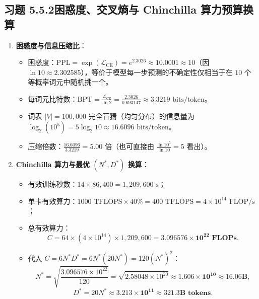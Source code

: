 \subsection*{习题 5.5.2\quad 困惑度、交叉熵与 Chinchilla 算力预算换算}
\begin{enumerate}[label=(\alph*), leftmargin=1.8em]
  \item \textbf{困惑度与信息压缩比}：
  \begin{itemize}
    \item 困惑度：$\mathrm{PPL} = \exp(\mathcal{L}_{\mathrm{CE}}) = e^{2.3026} \approx \mathbf{10.0001} \approx 10$（因 $\ln 10 \approx 2.302585$），等价于模型每一步预测的不确定性仅相当于在 $10$ 个等概率词元中随机挑一个。
    \item 每词元比特数：$\mathrm{BPT} = \frac{\mathcal{L}_{\mathrm{CE}}}{\ln 2} = \frac{2.3026}{0.693147} \approx \mathbf{3.3219}\text{ bits/token}$。
    \item 词表 $|V| = 100{,}000$ 完全盲猜（均匀分布）的信息量为 $\log_2(10^5) = 5\log_2 10 \approx \mathbf{16.6096}\text{ bits/token}$。
    \item 压缩倍数：$\frac{16.6096}{3.3219} = \mathbf{5.00\text{ 倍}}$（也可直接由 $\frac{\ln 10^5}{\ln 10} = 5$ 看出）。
  \end{itemize}

  \item \textbf{Chinchilla 算力与最优 $(N^*, D^*)$ 换算}：
  \begin{itemize}
    \item 有效训练秒数：$14 \times 86{,}400 = 1{,}209{,}600\text{ s}$；
    \item 单卡有效算力：$1000\text{ TFLOPS} \times 40\% = 400\text{ TFLOPS} = 4 \times 10^{14}\text{ FLOP/s}$；
    \item 总有效算力：
    \[
      C = 64 \times (4 \times 10^{14}) \times 1{,}209{,}600 = \mathbf{3.096576 \times 10^{22}\text{ FLOPs}}.
    \]
    \item 代入 $C = 6 N^* D^* = 6 N^* (20 N^*) = 120 (N^*)^2$：
    \[
      N^* = \sqrt{\frac{3.096576 \times 10^{22}}{120}} = \sqrt{2.58048 \times 10^{20}} \approx \mathbf{1.606 \times 10^{10}} \approx \mathbf{16.06\text{B}},
    \]
    \[
      D^* = 20 N^* \approx \mathbf{3.213 \times 10^{11}} \approx \mathbf{321.3\text{B}\text{ tokens}}.
    \]
  \end{itemize}
\end{enumerate}

